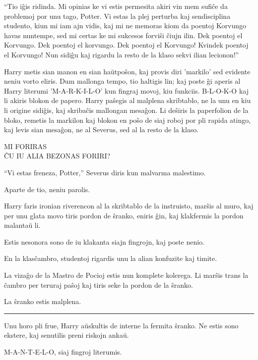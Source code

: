 ``Tio iĝis ridinda. Mi opinias ke vi estis permesita akiri vin mem
sufiĉe da problemoj por unu tago, Potter. Vi estas la plej perturba
kaj sendisciplina studento, kiun mi iam ajn vidis, kaj mi ne memoras
kiom da poentoj Korvungo havas nuntempe, sed mi certas ke mi sukcesos
forviŝi ĉiujn ilin. Dek poentoj el Korvungo. Dek poentoj el
korvungo. Dek poentoj el Korvungo! Kvindek poentoj el Korvungo! Nun
sidiĝu kaj rigardu la resto de la klaso sekvi ilian lecionon!''

Harry metis sian manon en sian haŭtpoŝon, kaj provis diri 'markilo'
sed evidente neniu vorto eliris. Dum mallonga tempo, tio haltigis lin;
kaj poste ĝi aperis al Harry literumi 'M-A-R-K-I-L-O' kun fingraj
movoj, kiu funkciis. B-L-O-K-O kaj li akiris blokon de papero. Harry
paŝegis al malplena skribtablo, ne la unu en kiu li origine sidiĝis,
kaj skribaĉis mallongan mesaĝon. Li deŝiris la paperfolion de la bloko,
remetis la markilon kaj blokon en poŝo de siaj roboj por pli rapida
atingo, kaj levis sian mesaĝon, ne al Severus, sed al la resto de la
klaso.

\begin {center}
  MI FORIRAS \\
  ĈU IU ALIA BEZONAS FORIRI?
\end{center}

``Vi estas freneza, Potter,'' Severus diris kun malvarma malestimo.

Aparte de tio, neniu parolis.

Harry faris ironian riverencon al la skribtablo de la instruisto,
marŝis al muro, kaj per unu glata movo tiris pordon de ŝranko, eniris
ĝin, kaj klakfermis la pordon malantaŭ li.

Estis nesonora sono de iu klakanta siajn fingrojn, kaj poste nenio.

En la klasĉambro, studentoj rigardis unu la alian konfuzite kaj timite.

La vizaĝo de la Mastro de Pocioj estis nun komplete kolerega. Li marŝis
trans la ĉambro per teruraj paŝoj kaj tiris seke la pordon de la
ŝranko.

La ŝranko estis malplena.

\begin{center}\rule{3in}{0.4pt}\end{center}

Unu horo pli frue, Harry aŭskultis de interne la fermita ŝranko. Ne
estis sono ekstere, kaj senutilis preni riskojn ankaŭ.

M-A-N-T-E-L-O, siaj fingroj literumis.


